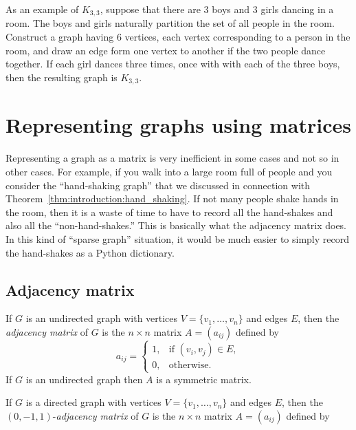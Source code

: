 As an example of $K_{3,3}$, suppose that there are $3$ boys and $3$
girls dancing in a room. The boys and girls naturally partition the
set of all people in the room. Construct a graph having $6$ vertices,
each vertex corresponding to a person in the room, and draw an edge
form one vertex to another if the two people dance together. If each
girl dances three times, once with with each of the three boys, then
the resulting graph is $K_{3,3}$.




\section{Representing graphs using matrices}

Representing a graph as a matrix is very inefficient in some cases
and not so in other cases. For example, if you walk into a large room
full of people and you consider the ``hand-shaking graph'' that we
discussed in connection with
Theorem~\ref{thm:introduction:hand_shaking}. If not many people shake
hands in the room, then it is a waste of time to have to record all
the hand-shakes and also all the ``non-hand-shakes.'' This is
basically what the adjacency matrix does. In this kind of
``sparse graph'' situation, it would be much easier to simply record
the hand-shakes as a Python dictionary.

\subsection{Adjacency matrix}

If $G$ is an undirected graph with vertices
$V = \{ v_1, \dots, v_n \}$ and edges $E$, then the
\emph{adjacency matrix} of $G$ is the $n \times n$ matrix $A = (a_{ij})$
defined by
\[
a_{ij}
=
\begin{cases}
1, & \text{if $(v_i, v_j) \in E$}, \\
0, & \text{otherwise}.
\end{cases}
\]
If $G$ is an undirected graph then $A$
is a symmetric matrix.

If $G$ is a directed graph with vertices $V = \{ v_1, \dots, v_n \}$
and edges $E$, then the $(0, -1, 1)$-\emph{adjacency matrix} of $G$ is
the $n \times n$ matrix $A = (a_{ij})$ defined by

